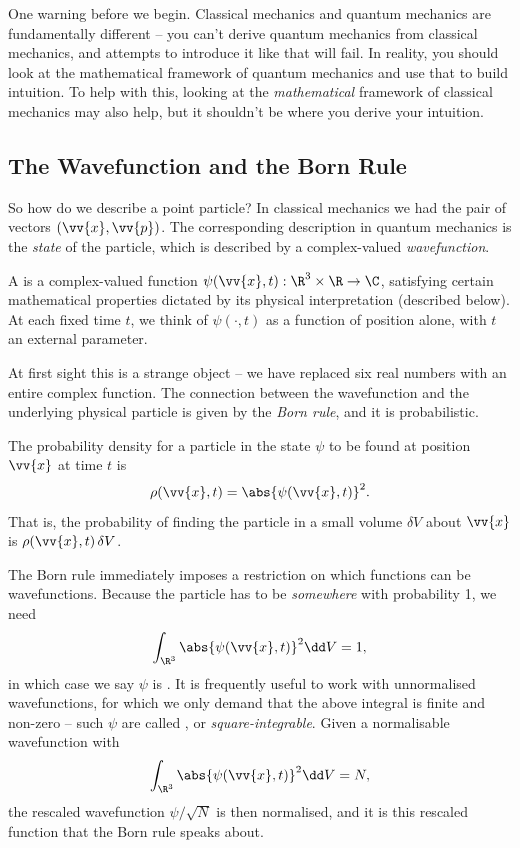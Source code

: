One warning before we begin. Classical mechanics and quantum mechanics are fundamentally different -- you can't derive quantum mechanics from classical mechanics, and attempts to introduce it like that will fail. In reality, you should look at the mathematical framework of quantum mechanics and use that to build intuition. To help with this, looking at the \emph{mathematical} framework of classical mechanics may also help, but it shouldn't be where you derive your intuition.

\subsection{The Wavefunction and the Born Rule}

So how do we describe a point particle? In classical mechanics we had the pair of vectors $(\vv{x}, \vv{p})$. The corresponding description in quantum mechanics is the \emph{state} of the particle, which is described by a complex-valued \emph{wavefunction}.

\begin{definition}[Wavefunction]
    A  is a complex-valued function $\psi(\vv{x}, t): \R^3 \times \R \rightarrow \C$, satisfying certain mathematical properties dictated by its physical interpretation (described below). At each fixed time $t$, we think of $\psi(\cdot, t)$ as a function of position alone, with $t$ an external parameter.
\end{definition}

At first sight this is a strange object -- we have replaced six real numbers with an entire complex function. The connection between the wavefunction and the underlying physical particle is given by the \emph{Born rule}, and it is probabilistic.

\begin{axiom}
    The probability density for a particle in the state $\psi$ to be found at position $\vv{x}$ at time $t$ is
    $$
    \rho(\vv{x}, t) = \abs{\psi(\vv{x}, t)}^2.
    $$
    That is, the probability of finding the particle in a small volume $\delta V$ about $\vv{x}$ is $\rho(\vv{x}, t) \, \delta V$.
\end{axiom}

The Born rule immediately imposes a restriction on which functions can be wavefunctions. Because the particle has to be \emph{somewhere} with probability 1, we need
$$
\int_{\R^3} \abs{\psi(\vv{x}, t)}^2 \dd V = 1,
$$
in which case we say $\psi$ is . It is frequently useful to work with unnormalised wavefunctions, for which we only demand that the above integral is finite and non-zero -- such $\psi$ are called , or \emph{square-integrable}. Given a normalisable wavefunction with
$$
\int_{\R^3} \abs{\psi(\vv{x}, t)}^2 \dd V = N,
$$
the rescaled wavefunction $\psi / \sqrt{N}$ is then normalised, and it is this rescaled function that the Born rule speaks about.

